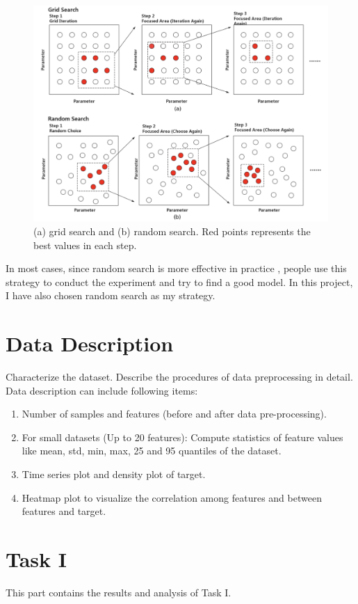 \documentclass[10pt]{article} %
\begin{document}
\begin{figure}[h]
 \centering
 \includegraphics[scale=0.4]{example.png}
 \caption{(a) grid search and (b) random search. Red points represents the best values in each step.} 
 \label{fig:example}
\end{figure}

In most cases, since random search is more effective in practice \cite{bergstra2012random}, people use this strategy to conduct the experiment and try to find a good model. In this project, I have also chosen random search as my strategy.

\section*{Data Description}
Characterize the dataset. Describe the procedures of data preprocessing in detail. Data description can include following items:

\begin{enumerate}
    \item Number of samples and features (before and after data pre-processing).
    \item For small datasets (Up to 20 features): Compute statistics of feature values like mean, std, min, max, 25 and 95 quantiles of the dataset. 
    \item Time series plot and density plot of target.
    \item Heatmap plot to visualize the correlation among features and between features and target.
\end{enumerate}

\section*{Task I}
This part contains the results and analysis of Task I.
\end{document}
